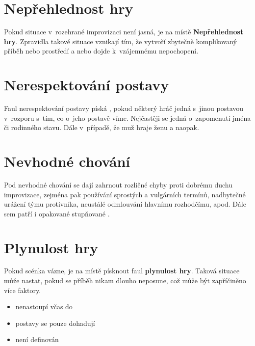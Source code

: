  
\needspace{5cm} \section{Nepřehlednost hry} \label{nepřehlednost hry}  
 
Pokud situace v~rozehrané improvizaci není jasná, je na místě  \textbf{Nepřehlednost hry}. Zpravidla takové situace vznikají tím, že  vytvoří zbytečně komplikovaný příběh nebo prostředí a nebo dojde k~vzájemnému nepochopení. 
 
 
\needspace{5cm} \section{Nerespektování postavy} \label{nerespektování postavy}  
 
Faul nerespektování postavy píská , pokud některý hráč  
jedná s~jinou postavou v~rozporu s~tím, co o~jeho postavě víme. 
Nejčastěji se jedná o~zapomenutí jména či rodinného stavu. 
Dále v~případě, že muž hraje ženu a naopak. 
\needspace{5cm} \section{Nevhodné chování} \label{nevhodné chování}  
 
 
Pod nevhodné chování se dají zahrnout rozličné chyby proti dobrému duchu 
improvizace, zejména pak používání sprostých a vulgárních termínů, 
nadbytečné urážení týmu protivníka, neustálé odmlouvání hlavnímu rozhodčímu,  
apod. Dále sem patří i opakované stupňované . 
\needspace{5cm} \section{Plynulost hry} \label{plynulost hry}  
 
Pokud scénka vázne, je na místě písknout faul \textbf{plynulost hry}. Taková situace může nastat, pokud se příběh nikam dlouho neposune, což může být zapříčiněno více faktory. 
 
\begin{itemize}
\item  {} nenastoupí včas do 
\item  postavy se pouze dohadují
\item  není definován 
\end{itemize}
 
